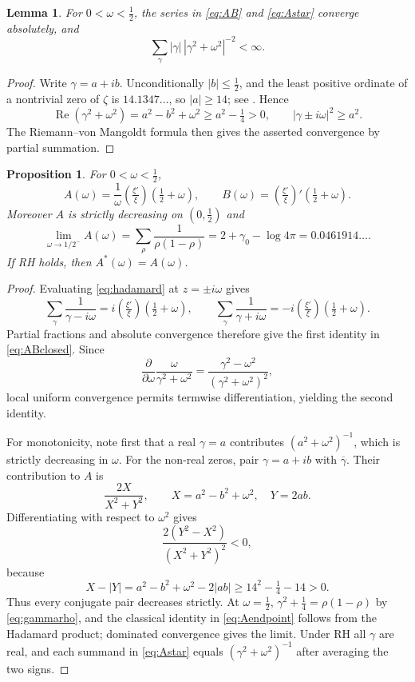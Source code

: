 \documentclass[11pt,reqno]{amsart}
\theoremstyle{plain}
\newtheorem{proposition}[theorem]{Proposition}
\newtheorem{lemma}[theorem]{Lemma}
\theoremstyle{definition}
\newcommand{\Rp}{\operatorname{Re}}
\newcommand{\lxi}[1]{\left(\tfrac{\xi'}{\xi}\right)\!#1}
\begin{document}
\begin{lemma}\label{lem:conv}
For $0<\omega<\tfrac12$, the series in \eqref{eq:AB} and \eqref{eq:Astar} converge absolutely, and
\[
 \sum_\gamma |\gamma|\,|\gamma^2+\omega^2|^{-2}<\infty.
\]
\end{lemma}

\begin{proof}
Write $\gamma=a+ib$.  Unconditionally $|b|\le\tfrac12$, and the least positive ordinate of a
nontrivial zero of $\zeta$ is $14.1347\ldots$, so $|a|\ge14$; see \cite{Titchmarsh}.  Hence
\[
 \Rp(\gamma^2+\omega^2)=a^2-b^2+\omega^2\ge a^2-\tfrac14>0,
 \qquad
 |\gamma\pm i\omega|^2\ge a^2.
\]
The Riemann--von Mangoldt formula then gives the asserted convergence by partial summation.
\end{proof}

\begin{proposition}\label{prop:AB}
For $0<\omega<\tfrac12$,
\begin{equation}\label{eq:ABclosed}
 A(\omega)=\frac1\omega\lxi{\left(\tfrac12+\omega\right)},
 \qquad
 B(\omega)=\lxi{'\left(\tfrac12+\omega\right)}.
\end{equation}
Moreover $A$ is strictly decreasing on $(0,\tfrac12)$ and
\begin{equation}\label{eq:Aendpoint}
 \lim_{\omega\to1/2^-}A(\omega)
 =\sum_\rho\frac1{\rho(1-\rho)}
 =2+\gamma_0-\log 4\pi
 =0.0461914\ldots.
\end{equation}
If RH holds, then $A^*(\omega)=A(\omega)$.
\end{proposition}

\begin{proof}
Evaluating \eqref{eq:hadamard} at $z=\pm i\omega$ gives
\[
 \sum_\gamma\frac1{\gamma-i\omega}
 =i\lxi{\left(\tfrac12+\omega\right)},
 \qquad
 \sum_\gamma\frac1{\gamma+i\omega}
 =-i\lxi{\left(\tfrac12+\omega\right)}.
\]
Partial fractions and absolute convergence therefore give the first identity in
\eqref{eq:ABclosed}.  Since
\[
 \frac{\partial}{\partial\omega}\frac{\omega}{\gamma^2+\omega^2}
 =\frac{\gamma^2-\omega^2}{(\gamma^2+\omega^2)^2},
\]
local uniform convergence permits termwise differentiation, yielding the second identity.

For monotonicity, note first that a real $\gamma=a$ contributes $(a^2+\omega^2)^{-1}$, which is
strictly decreasing in $\omega$.  For the non-real zeros, pair $\gamma=a+ib$ with
$\overline\gamma$.  Their contribution to $A$ is
\[
 \frac{2X}{X^2+Y^2},
 \qquad
 X=a^2-b^2+\omega^2,
 \quad Y=2ab.
\]
Differentiating with respect to $\omega^2$ gives
\[
 \frac{2(Y^2-X^2)}{(X^2+Y^2)^2}<0,
\]
because
\[
 X-|Y|=a^2-b^2+\omega^2-2|ab|
 \ge 14^2-\tfrac14-14>0.
\]
Thus every conjugate pair decreases strictly.  At $\omega=\tfrac12$,
$\gamma^2+\tfrac14=\rho(1-\rho)$ by \eqref{eq:gammarho}, and the classical identity in
\eqref{eq:Aendpoint} follows from the Hadamard product; dominated convergence gives the limit.
Under RH all $\gamma$ are real, and each summand in \eqref{eq:Astar} equals
$(\gamma^2+\omega^2)^{-1}$ after averaging the two signs.
\end{proof}
\end{document}
